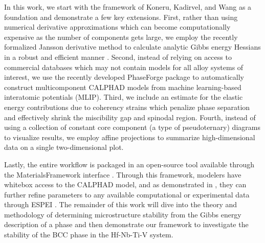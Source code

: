 In this work, we start with the framework of Koneru, Kadirvel, and Wang as a foundation and demonstrate a few key extensions. First, rather than using numerical derivative approximations which can become computationally expensive as the number of components gets large, we employ the recently formalized Jansson derivative method to calculate analytic Gibbs energy Hessians in a robust and efficient manner \cite{kunselman2024analytically}. Second, instead of relying on access to commercial databases which may not contain models for all alloy systems of interest, we use the recently developed PhaseForge package \cite{sariturk_2025_15730911} to automatically construct multicomponent CALPHAD models from machine learning-based interatomic potentials (MLIP). Third, we include an estimate for the elastic energy contributions due to coherency strains which penalize phase separation and effectively shrink the miscibility gap and spinodal region. Fourth, instead of using a collection of constant core component (a type of pseudoternary) diagrams to visualize results, we employ affine projections \cite{vela2025visualizing} to summarize high-dimensional data on a single two-dimensional plot. 

Lastly, the entire workflow is packaged in an open-source tool available through the MaterialsFramework interface \cite{sariturk_2025_15731044}. Through this framework, modelers have whitebox access to the CALPHAD model, and as demonstrated in \cite{kunselman2025construction}, they can further refine parameters to any available computational or experimental data through ESPEI \cite{bocklund2019espei}. The remainder of this work will dive into the theory and methodology of determining microstructure stability from the Gibbs energy description of a phase and then demonstrate our framework to investigate the stability of the BCC phase in the Hf-Nb-Ti-V system.

